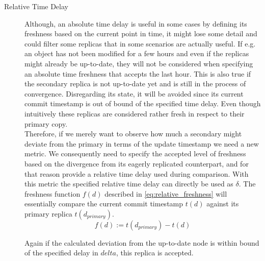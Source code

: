 \begin{description}
    \item [Relative Time Delay] 
    Although, an absolute time delay is useful in some cases by defining its freshness based on the current point in time, 
    it might lose some detail and could filter some replicas that in some scenarios are actually useful.
    If e.g. an object has not been modified for a few hours and even if the replicas might already be up-to-date, they will not be considered when specifying 
    an absolute time freshness that accepts the last hour.
    This is also true if the secondary replica is not up-to-date yet and is still in the process of convergence.
    Disregarding its state, it will be avoided since its current commit timestamp is out of bound of the specified time delay.
    Even though intuitively these replicas are considered rather fresh in respect to their primary copy.\\
    Therefore, if we merely want to observe how much a secondary might deviate from the primary in terms of the update timestamp we need a new metric.
    We consequently need to specify the accepted level of freshness based on the divergence from its eagerly replicated counterpart, 
    and for that reason provide a relative time delay used during comparison.
    With this metric the specified relative time delay can directly be used as $\delta$. The freshness function $f(d)$ described in \ref{eq:relative_freshness}
    will essentially compare the current commit timestamp $t(d)$ against its primary replica $t(d_{primary})$.
        \begin{equation} \label{eq:relative_freshness}
            f(d) := t(d_{primary}) - t(d)
        \end{equation}

    Again if the calculated deviation from the up-to-date node is within bound of the specified delay in $delta$, this replica is accepted.




\end{description}
